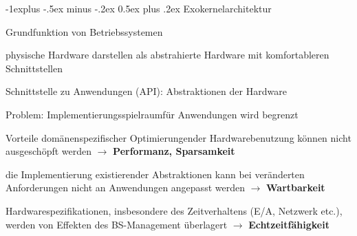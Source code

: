 \documentclass[a4paper]{article}
\makeatletter
\renewcommand{\subsection}{\@startsection{subsection}{2}{0mm}%
 {-1explus -.5ex minus -.2ex}%
 {0.5ex plus .2ex}%
 {\normalfont\normalsize\bfseries}}
\makeatother
\begin{document}
\begin{multicols}{3}
    \subsection{Exokernelarchitektur}
    \begin{itemize*}
        \item Grundfunktion von Betriebssystemen
        \begin{itemize*}
            \item physische Hardware darstellen als abstrahierte Hardware mit komfortableren Schnittstellen
            \item Schnittstelle zu Anwendungen (API): Abstraktionen der Hardware
        \end{itemize*}
        \item Problem: Implementierungsspielraumfür Anwendungen wird begrenzt
        \begin{enumerate*}
            \item Vorteile domänenspezifischer Optimierungender Hardwarebenutzung können nicht ausgeschöpft werden $\rightarrow$ \textbf{Performanz, Sparsamkeit}
            \item die Implementierung existierender Abstraktionen kann bei veränderten Anforderungen nicht an Anwendungen angepasst werden $\rightarrow$ \textbf{Wartbarkeit}
            \item Hardwarespezifikationen, insbesondere des Zeitverhaltens (E/A, Netzwerk etc.), werden von Effekten des BS-Management überlagert $\rightarrow$ \textbf{Echtzeitfähigkeit}
        \end{enumerate*}
    \end{itemize*}



\end{multicols}
\end{document}
